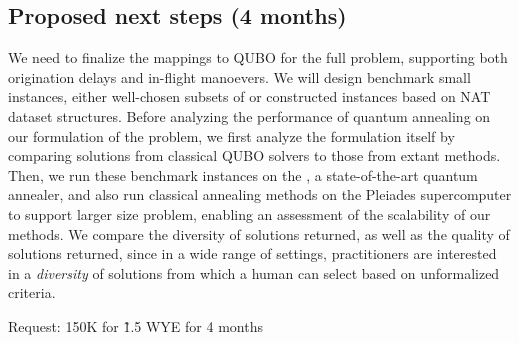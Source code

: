 \subsection*{Proposed next steps (4 months)}\label{sec:ass}

We need to finalize the mappings to QUBO for the full problem,
supporting both origination delays and in-flight manoevers.
We will design benchmark small instances, either well-chosen subsets of 
or constructed instances based on NAT dataset structures. 
Before analyzing the performance of quantum annealing on our
formulation of the problem, we first analyze the formulation itself by
comparing solutions from classical QUBO solvers to those from extant methods.
Then, we run these benchmark instances on the \DW, a
state-of-the-art quantum annealer, and also 
run classical annealing methods on the Pleiades supercomputer 
to support larger size problem, enabling an assessment of 
the scalability of our methods.  
We compare the diversity of solutions returned,
as well as the quality of solutions 
returned,
since in a wide range of settings, practitioners are interested in 
a \emph{diversity} of
solutions from which a human can select based on unformalized criteria.



Request: 150K for \~ 1.5 WYE for 4 months


